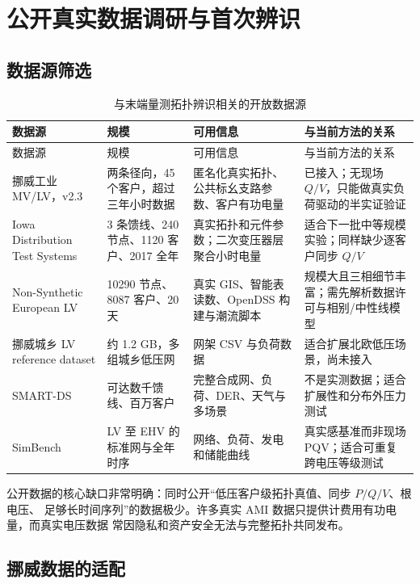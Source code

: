 \section{公开真实数据调研与首次辨识}

\subsection{数据源筛选}

\begin{longtable}{p{3.1cm}p{3.2cm}p{4.1cm}p{4.2cm}}
\caption{与末端量测拓扑辨识相关的开放数据源}\label{tab:datasets}\\
\toprule
数据源 & 规模 & 可用信息 & 与当前方法的关系\\
\midrule
\endfirsthead
\toprule
数据源 & 规模 & 可用信息 & 与当前方法的关系\\
\midrule
\endhead
挪威工业 MV/LV，v2.3\cite{sandell2023}
& 两条径向，45 个客户，超过三年小时数据
& 匿名化真实拓扑、公共标幺支路参数、客户有功电量
& 已接入；无现场 $Q/V$，只能做真实负荷驱动的半实证验证\\
Iowa Distribution Test Systems\cite{iowa}
& 3 条馈线、240 节点、1120 客户、2017 全年
& 真实拓扑和元件参数；二次变压器层聚合小时电量
& 适合下一批中等规模实验；同样缺少逐客户同步 $Q/V$\\
Non-Synthetic European LV\cite{arboleya2019}
& 10290 节点、8087 客户、20 天
& 真实 GIS、智能表读数、OpenDSS 构建与潮流脚本
& 规模大且三相细节丰富；需先解析数据许可与相别/中性线模型\\
挪威城乡 LV reference dataset\cite{norwaylv2024}
& 约 1.2 GB，多组城乡低压网
& 网架 CSV 与负荷数据
& 适合扩展北欧低压场景，尚未接入\\
SMART-DS\cite{smartds}
& 可达数千馈线、百万客户
& 完整合成网、负荷、DER、天气与多场景
& 不是实测数据；适合扩展性和分布外压力测试\\
SimBench\cite{simbench}
& LV 至 EHV 的标准网与全年时序
& 网络、负荷、发电和储能曲线
& 真实感基准而非现场 PQV；适合可重复跨电压等级测试\\
\bottomrule
\end{longtable}

公开数据的核心缺口非常明确：同时公开“低压客户级拓扑真值、同步 $P/Q/V$、根电压、
足够长时间序列”的数据极少。许多真实 AMI 数据只提供计费用有功电量，而真实电压数据
常因隐私和资产安全无法与完整拓扑共同发布。

\subsection{挪威数据的适配}

